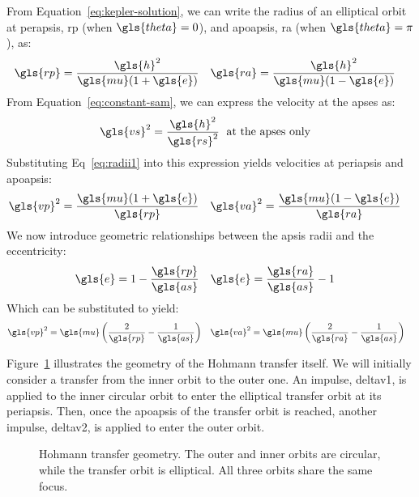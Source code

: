 \documentclass[12pt,openany]{book}
\begin{document}
From Equation~\ref{eq:kepler-solution}, we can write the radius of an elliptical orbit at perapsis, \gls{rp} (when \(\gls{theta}=0\)), and apoapsis, \gls{ra} (when \(\gls{theta}=\pi\)), as:
\begin{align}
  \gls{rp} &= \frac{\gls{h}^2}{\gls{mu}(1+\gls{e})} &
  \gls{ra} &= \frac{\gls{h}^2}{\gls{mu}(1-\gls{e})} \label{eq:radii1}
\end{align}
From Equation~\ref{eq:constant-sam}, we can express the velocity at the apses as:
\begin{align}
  \gls{vs}^2 &= \frac{\gls{h}^2}{\gls{rs}^2}\;\textrm{ at the apses only}
\end{align}
Substituting Eq~\ref{eq:radii1} into this expression yields velocities at periapsis and apoapsis:
\begin{align}
  \gls{vp}^2 &= \frac{\gls{mu}(1+\gls{e})}{\gls{rp}} &
  \gls{va}^2 &= \frac{\gls{mu}(1-\gls{e})}{\gls{ra}}
\end{align}
We now introduce geometric relationships between the apsis radii and the eccentricity:
\begin{align}
  \gls{e} &= 1 - \frac{\gls{rp}}{\gls{as}} &
  \gls{e} &= \frac{\gls{ra}}{\gls{as}} - 1
\end{align}
Which can be substituted to yield:
\begin{align}
  \gls{vp}^2 &= \gls{mu}\left(\frac{2}{\gls{rp}}-\frac{1}{\gls{as}}\right) &
  \gls{va}^2 &= \gls{mu}\left(\frac{2}{\gls{ra}}-\frac{1}{\gls{as}}\right) &
\end{align}

Figure~\ref{fig:hohmann-geometry} illustrates the geometry of the Hohmann transfer itself. We will initially consider a transfer from the inner orbit to the outer one. An impulse, \gls{deltav1}, is applied to the inner circular orbit to enter the elliptical transfer orbit at its periapsis. Then, once the apoapsis of the transfer orbit is reached, another impulse, \gls{deltav2}, is applied to enter the outer orbit.

\begin{figure}[htbp]
  \centering
  \caption{Hohmann transfer geometry. The outer and inner orbits are circular, while the transfer orbit is elliptical. All three orbits share the same focus.}
  \label{fig:hohmann-geometry}
\end{figure}
\end{document}
